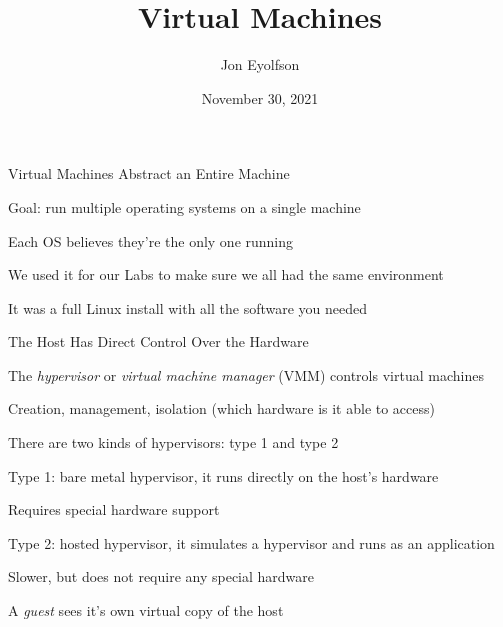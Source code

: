 

\title{Virtual Machines}
\author{Jon Eyolfson}
\date{November 30, 2021}


  \begin{frame}
    \titlepage
  \end{frame}

  \begin{frame}{Virtual Machines Abstract an Entire Machine}

    Goal: run multiple operating systems on a single machine

    \hspace{2em} Each OS believes they're the only one running

    \vspace{2em}

    We used it for our Labs to make sure we all had the same environment

    \hspace{2em} It was a full Linux install with all the software you needed
  \end{frame}

  \begin{frame}{The Host Has Direct Control Over the Hardware}

    The \textit{hypervisor} or \textit{virtual machine manager} (VMM) controls
    virtual machines

    \hspace{2em} Creation, management, isolation (which hardware is it able to
    access)

    \vspace{2em}

    There are two kinds of hypervisors: type 1 and type 2

    \hspace{2em} Type 1: bare metal hypervisor, it runs directly on the host's
    hardware

    \hspace{4em} Requires special hardware support

    \hspace{2em} Type 2: hosted hypervisor, it simulates a hypervisor and runs
                 as an application

    \hspace{4em} Slower, but does not require any special hardware

    \vspace{2em}

    A \textit{guest} sees it's own virtual copy of the host
  \end{frame}

